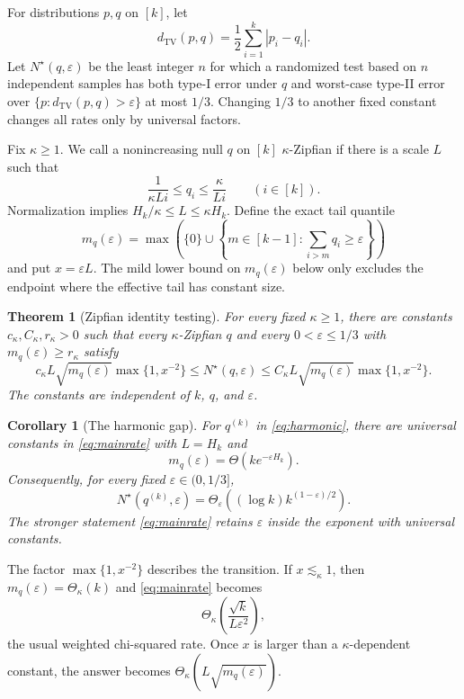 \documentclass{article}
\newtheorem{theorem}{Theorem}
\newtheorem{corollary}{Corollary}
\newcommand{\TV}{d_{\mathrm{TV}}}
\newcommand{\1}{\mathbf 1}
\newcommand{\Nstar}{N^\star}
\begin{document}
For distributions $p,q$ on $[k]$, let \[ \TV(p,q)=\frac12\sum_{i=1}^k|p_i-q_i|. \] Let $\Nstar(q,\varepsilon)$ be the least integer $n$ for which a randomized test based on $n$ independent samples has both type-I error under $q$ and worst-case type-II error over $\{p:\TV(p,q)>\varepsilon\}$ at most $1/3$. Changing $1/3$ to another fixed constant changes all rates only by universal factors.

Fix $\kappa\geq1$. We call a nonincreasing null $q$ on $[k]$ $\kappa$-Zipfian if there is a scale $L$ such that \[ \frac{1}{\kappa Li}\leq q_i\leq\frac{\kappa}{Li} \qquad(i\in[k]).                                       \tag{2}\label{eq:zipfenvelope} \] Normalization implies $H_k/\kappa\leq L\leq\kappa H_k$. Define the exact tail quantile \[ m_q(\varepsilon)= \max\left(\{0\}\cup \left\{m\in[k-1]:\sum_{i>m}q_i\geq\varepsilon\right\}\right) \] and put $x=\varepsilon L$. The mild lower bound on $m_q(\varepsilon)$ below only excludes the endpoint where the effective tail has constant size.

\begin{theorem}[Zipfian identity testing]
\label{thm:main}
For every fixed $\kappa\geq1$, there are constants $c_\kappa,C_\kappa,r_\kappa>0$ such that every $\kappa$-Zipfian $q$ and every $0<\varepsilon\leq1/3$ with $m_q(\varepsilon)\geq r_\kappa$ satisfy \[ c_\kappa L\sqrt{m_q(\varepsilon)}\max\{1,x^{-2}\} \leq \Nstar(q,\varepsilon) \leq C_\kappa L\sqrt{m_q(\varepsilon)}\max\{1,x^{-2}\}. \tag{3}\label{eq:mainrate} \] The constants are independent of $k$, $q$, and $\varepsilon$.
\end{theorem}

\begin{corollary}[The harmonic gap]
\label{cor:fixed}
For $q^{(k)}$ in \eqref{eq:harmonic}, there are universal constants in \eqref{eq:mainrate} with $L=H_k$ and \[ m_q(\varepsilon)=\Theta(k e^{-\varepsilon H_k}). \] Consequently, for every fixed $\varepsilon\in(0,1/3]$, \[ \Nstar(q^{(k)},\varepsilon) =\Theta_\varepsilon\!\left((\log k)k^{(1-\varepsilon)/2}\right). \] The stronger statement \eqref{eq:mainrate} retains $\varepsilon$ inside the exponent with universal constants.
\end{corollary}

The factor $\max\{1,x^{-2}\}$ describes the transition. If $x\lesssim_\kappa1$, then $m_q(\varepsilon)=\Theta_\kappa(k)$ and \eqref{eq:mainrate} becomes \[ \Theta_\kappa\left(\frac{\sqrt{k}}{L\varepsilon^2}\right), \] the usual weighted chi-squared rate. Once $x$ is larger than a $\kappa$-dependent constant, the answer becomes $\Theta_\kappa(L\sqrt{m_q(\varepsilon)})$.
\end{document}
